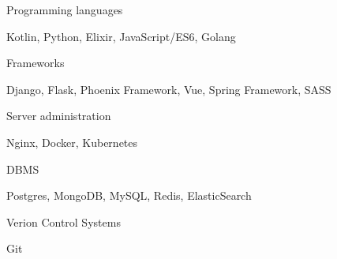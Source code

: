 \begin{cventries}
  \cventry
    {Programming languages}
    {}
    {}
    {}
    {
      \begin{cvitems}
        \item {Kotlin, Python, Elixir, JavaScript/ES6, Golang}
      \end{cvitems}
    }
  \cventry
    {Frameworks}
    {}
    {}
    {}
    {
      \begin{cvitems}
        \item {Django, Flask, Phoenix Framework, Vue, Spring Framework, SASS}
      \end{cvitems}
    }
  \cventry
    {Server administration}
    {}
    {}
    {}
    {
      \begin{cvitems}
        \item {Nginx, Docker, Kubernetes}
      \end{cvitems}
    }
  \cventry
    {DBMS}
    {}
    {}
    {}
    {
      \begin{cvitems}
        \item {Postgres, MongoDB, MySQL, Redis, ElasticSearch}
      \end{cvitems}
    }
  \cventry
    {Verion Control Systems}
    {}
    {}
    {}
    {
      \begin{cvitems}
        \item {Git}
      \end{cvitems}
    }
\end{cventries}
